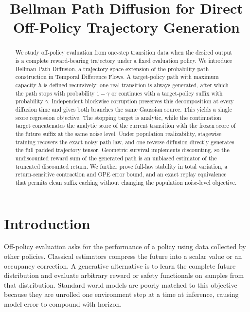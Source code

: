 \documentclass[11pt]{article}
\title{Bellman Path Diffusion for Direct Off-Policy Trajectory Generation}
\author{}
\date{}
\theoremstyle{definition}
\theoremstyle{remark}
\begin{document}
\maketitle

\begin{abstract}
We study off-policy evaluation from one-step transition data when the desired
output is a complete reward-bearing trajectory under a fixed evaluation
policy. We introduce Bellman Path Diffusion, a trajectory-space extension of
the probability-path construction in Temporal Difference Flows. A target-policy
path with maximum capacity $h$ is defined recursively: one real transition is
always generated, after which the path stops with probability $1-\gamma$ or
continues with a target-policy suffix with probability $\gamma$. Independent
blockwise corruption preserves this decomposition at every diffusion time and
gives both branches the same Gaussian source. This yields a single score
regression objective. The stopping target is analytic, while the continuation
target concatenates the analytic score of the current transition with the
frozen score of the future suffix at the same noise level. Under population
realizability, stagewise training recovers the exact noisy path law, and one
reverse diffusion directly generates the full padded trajectory tensor.
Geometric survival implements discounting, so the undiscounted reward sum of
the generated path is an unbiased estimator of the truncated discounted
return. We further prove full-law stability in total variation, a
return-sensitive contraction and OPE error bound, and an exact replay
equivalence that permits clean suffix caching without changing the population
noise-level objective.
\end{abstract}

\section{Introduction}
\label{sec:introduction}

Off-policy evaluation asks for the performance of a policy using data collected
by other policies. Classical estimators compress the future into a scalar value
or an occupancy correction. A generative alternative is to learn the complete
future distribution and evaluate arbitrary reward or safety functionals on
samples from that distribution. Standard world models are poorly matched to
this objective because they are unrolled one environment step at a time at
inference, causing model error to compound with horizon.
\end{document}
